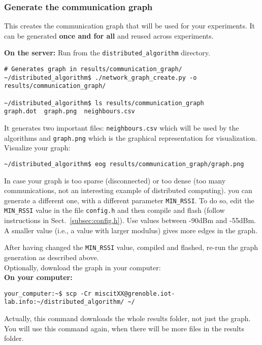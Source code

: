 \documentclass[oneside]{article}
\begin{document}
      


\subsubsection{Generate the communication graph}

This creates the communication graph that
will be used for your experiments. It can be generated \textbf{once and for all} and
reused across experiments.

\textbf{On the server:}
Run from the \verb=distributed_algorithm= directory.

\begin{verbatim}# Generates graph in results/communication_graph/
~/distributed_algorithm$ ./network_graph_create.py -o results/communication_graph/

~/distributed_algorithm$ ls results/communication_graph
graph.dot  graph.png  neighbours.csv \end{verbatim}

It generates two important files:
\texttt{neighbours.csv} which will be used by the algorithms and
\texttt{graph.png} which is the graphical representation for visualization.\\

Visualize your graph:
\begin{verbatim}
~/distributed_algorithm$ eog results/communication_graph/graph.png
\end{verbatim}

In case your graph is too sparse (disconnected) 
or too dense (too many communications, 
not an interesting example of distributed computing).
you can generate a different one,
with a different parameter \verb=MIN_RSSI=.
To do so, edit the \verb=MIN_RSSI= value in the file
\verb=config.h=  and then compile and flash
(follow instructions in Sect.~\ref{subsec:config.h}).
Use values between -90dBm  and -55dBm.
A smaller value (i.e., a value with larger modulus) gives more edges in the graph.

After having changed the \verb=MIN_RSSI= value, compiled and flashed, re-run the graph generation as described above.\\

Optionally, download the graph in your computer:\\
\textbf{On your computer:} 
\begin{verbatim}
your_computer:~$ scp -Cr miscitXX@grenoble.iot-lab.info:~/distributed_algorithm/ ~/
\end{verbatim}
Actually, this command downloads the whole results folder, not just the graph. You will use this command again, when there will be more files in the results folder.
\end{document}
